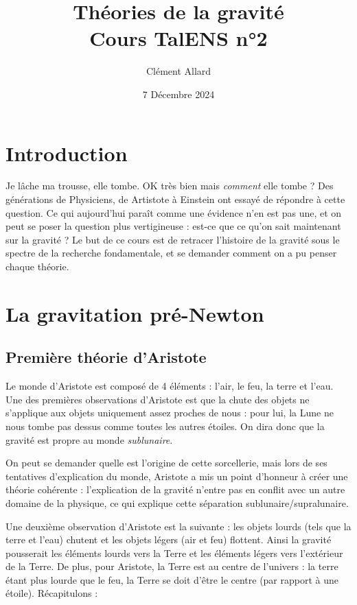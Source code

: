 \documentclass{classe}
\title{Théories de la gravité\\ \small Cours TalENS n°2}
\author{Clément Allard}
\date{7 Décembre 2024}
\begin{document}
\section*{Introduction}

Je lâche ma trousse, elle tombe. OK très bien mais \textit{comment} elle tombe ? Des générations de Physiciens, de Artistote à Einstein ont essayé de répondre à cette question. Ce qui aujourd'hui paraît comme une évidence n'en est pas une, et on peut se poser la question plus vertigineuse : est-ce que ce qu'on sait maintenant sur la gravité ? Le but de ce cours est de retracer l'histoire de la gravité sous le spectre de la recherche fondamentale, et se demander comment on a pu penser chaque théorie.

\section{La gravitation pré-Newton}

\subsection{Première théorie d'Aristote}

Le monde d'Aristote est composé de 4 éléments : l'air, le feu, la terre et l'eau. Une des premières observations d'Aristote est que la chute des objets ne s'applique aux objets uniquement assez proches de nous : pour lui, la Lune ne nous tombe pas dessus comme toutes les autres étoiles. On dira donc que la gravité est propre au monde \textit{sublunaire}.

\begin{remarque}{}{}
On peut se demander quelle est l'origine de cette sorcellerie, mais lors de ses tentatives d'explication du monde, Aristote a mis un point d'honneur à créer une théorie cohérente : l'explication de la gravité n'entre pas en conflit avec un autre domaine de la physique, ce qui explique cette séparation sublunaire/supralunaire.
\end{remarque}{}

Une deuxième observation d'Aristote est la suivante : les objets lourds (tels que la terre et l'eau) chutent et les objets légers (air et feu) flottent. Ainsi la gravité pousserait les éléments lourds vers la Terre et les éléments légers vers l'extérieur de la Terre. De plus, pour Aristote, la Terre est au centre de l'univers : la terre étant plus lourde que le feu, la Terre se doit d'être le centre (par rapport à une étoile). Récapitulons :
\end{document}
